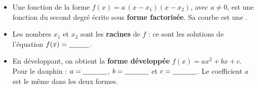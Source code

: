 \documentclass[12pt,a4paper]{article}
\begin{document}
\begin{bilan}
\begin{itemize}[leftmargin=1.2em]
\item Une fonction de la forme $f(x) = a\,(x - x_1)(x - x_2)$, avec $a \neq 0$, est une fonction du second degré écrite sous \textbf{forme factorisée}. Sa courbe est une \trou{2.5cm}.
\item Les nombres $x_1$ et $x_2$ sont les \textbf{racines} de $f$ : ce sont les solutions de l'équation \mbox{$f(x) = \trou{1cm}$}.
\item En développant, on obtient la \textbf{forme développée} $f(x) = ax^2 + bx + c$. Pour le dauphin : $a = \trou{1.2cm}$, $b = \trou{1.2cm}$ et $c = \trou{1.2cm}$. Le coefficient $a$ est le même dans les deux formes.
\end{itemize}
\end{bilan}
\end{document}
